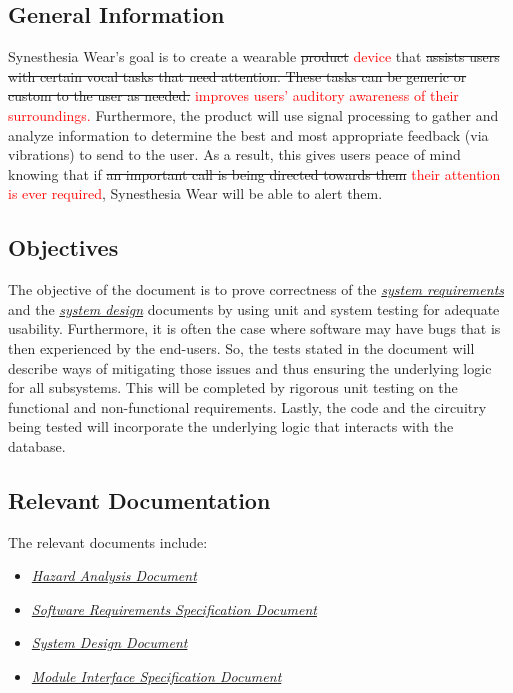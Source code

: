 \documentclass[12pt, titlepage]{article}
\begin{document}
\subsection{General Information}

Synesthesia Wear's goal is to create a wearable \sout{product} \textcolor{red}{device} that \sout{assists users with certain vocal tasks that need attention. These tasks can be generic or custom to the user as needed.} \textcolor{red}{improves users' auditory awareness of their surroundings.} Furthermore, the product will use signal processing to gather and analyze information to determine the best and most appropriate feedback (via vibrations) to send to the user. As a result, this gives users peace of mind knowing that if \sout{an important call is being directed towards them} \textcolor{red}{their attention is ever required}, Synesthesia Wear will be able to alert them.

\subsection{Objectives}

The objective of the document is to prove correctness of the \href{https://github.com/jordanbierbrier/capstone/blob/main/docs/SRS/SRS.pdf}{\textit{system requirements}} and the \href{https://github.com/jordanbierbrier/capstone/blob/main/docs/Design/SystDesign/SystDes.pdf}{\textit{system design}} documents by using unit and system testing for adequate usability. Furthermore, it is often the case where software may have bugs that is then experienced by the end-users. So, the tests stated in the document will describe ways of mitigating those issues and thus ensuring the underlying logic for all subsystems. This will be completed by rigorous unit testing on the functional and non-functional requirements. Lastly, the code and the circuitry being tested will incorporate the underlying logic that interacts with the database.
\subsection{Relevant Documentation}

The relevant documents include:
\begin{itemize}
\item \href{https://github.com/jordanbierbrier/capstone/blob/main/docs/HazardAnalysis/HazardAnalysis.pdf}{\textit{Hazard Analysis Document}}
\item \href{https://github.com/jordanbierbrier/capstone/blob/main/docs/SRS/SRS.pdf}{\textit{Software Requirements Specification Document}}
\item \href{https://github.com/jordanbierbrier/capstone/blob/main/docs/Design/SystDesign/SystDes.pdf}{\textit{System Design Document}}
\item \href{https://github.com/jordanbierbrier/capstone/blob/main/docs/Design/SoftDetailedDes/MIS.pdf}{\textit{Module Interface Specification Document}}

\end{itemize}
\end{document}
